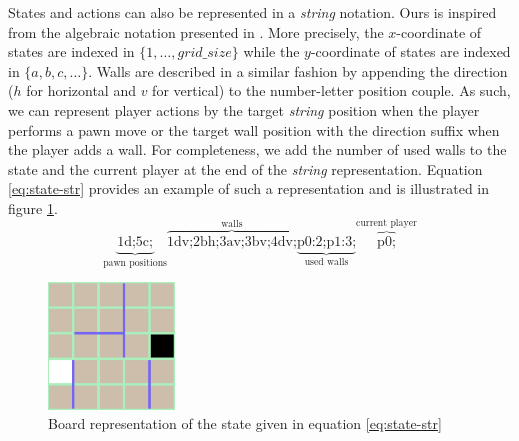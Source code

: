\documentclass[journal, a4paper]{IEEEtran}
\begin{document}
States and actions can also be represented in a \textit{string} notation. Ours is inspired from the algebraic notation presented in \cite{quoridor-wikipedia}. More precisely, the $x$-coordinate of states are indexed in $\{1, \ldots, grid\_ size\}$ while the $y$-coordinate of states are indexed in $\{a, b, c, \ldots\}$. Walls are described in a similar fashion by appending the direction ($h$ for horizontal and $v$ for vertical) to the number-letter position couple. As such, we can represent player actions by the target \textit{string} position when the player performs a pawn move or the target wall position with the direction suffix when the player adds a wall. For completeness, we add the number of used walls to the state and the current player at the end of the \textit{string} representation. Equation \ref{eq:state-str} provides an example of such a representation and is illustrated in figure \ref{fig:state-str}.
\begin{equation}
    \label{eq:state-str}
    \underbrace{\text{1d;5c;}}_\text{pawn positions}\overbrace{\text{1dv;2bh;3av;3bv;4dv;}}^\text{walls}\underbrace{\text{p0:2;p1:3;}}_\text{used walls}\overbrace{\text{p0;}}^\text{current player}
\end{equation}
\begin{figure}
    \centering
    \includegraphics[width=0.3\textwidth]{figures/state-str.png}
    \caption{Board representation of the state given in equation \ref{eq:state-str}}
    \label{fig:state-str}
\end{figure}
\end{document}
